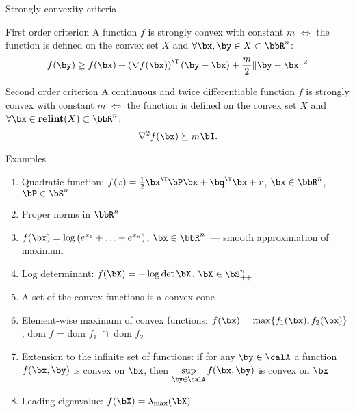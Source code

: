 \documentclass[12pt]{beamer}
\begin{document}
\begin{frame}{Strongly convexity criteria}

\begin{block}{First order criterion}
A function $f$ is strongly convex with constant $m$ $\Leftrightarrow$ the function is defined on the convex set $X$ and $\forall \bx, \by \in X \subset \bbR^n$:
\vspace{-4mm}
\[
f(\by) \geq f(\bx) + \left( \nabla f(\bx) \right)^{\T}(\by - \bx) + \frac{m}{2}\| \by - \bx \|^2
\]
\end{block}

\begin{block}{Second order criterion}
A continuous and twice differentiable function $f$ is strongly convex with constant $m$ $\Leftrightarrow$ the function is defined on the convex set $X$ and $\forall \bx \in \text{\bf relint}(X) \subset \bbR^n$:
\vspace{-2mm}
\[
\nabla^2 f(\bx) \succeq m\bI.
\]
\end{block}
\end{frame}

\begin{frame}{Examples}
\begin{enumerate}
\item Quadratic function: $f(x) = \frac{1}{2}\bx^{\T}\bP\bx + \bq^{\T}\bx + r$, $\bx \in \bbR^n$, $\bP \in \bS^n$
\item Proper norms in $\bbR^n$
\item $f(\bx) = \log{(e^{x_1} + \ldots + e^{x_n})}$, $\bx \in \bbR^n$~--- smooth approximation of maximum
\item Log determinant: $f(\bX) = -\log{\det{\bX}}$, $\bX \in \bS^n_{++}$
\item A set of the convex functions is a convex cone
\item Element-wise maximum of convex functions: $f(\bx) = \max\{f_1(\bx), f_2(\bx)\}$, dom $f$ = dom $f_1 \; \cap $ dom $f_2$
\item Extension to the infinite set of functions: if for any $\by \in \calA$ a function $f(\bx, \by)$ is convex on $\bx$, then $\sup\limits_{\by \in \calA} f(\bx, \by)$ is convex on $\bx$
\item Leading eigenvalue: $f(\bX) = \lambda_{\max}(\bX)$ 
\end{enumerate}
\end{frame}
\end{document}
